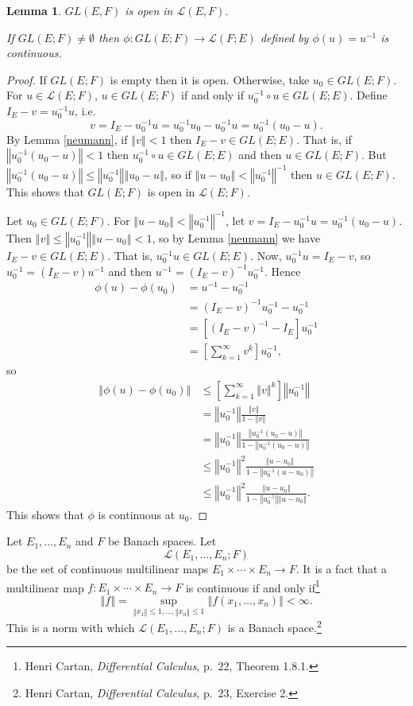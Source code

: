 \documentclass{article}
\newcommand{\norm}[1]{\left\Vert #1 \right\Vert}
\newtheorem{lemma}[theorem]{Lemma}
\theoremstyle{definition}
\begin{document}
\begin{lemma}
$GL(E,F)$ is  open  in $\mathscr{L}(E,F)$.

If $GL(E;F) \neq \emptyset$ then
$\phi:GL(E;F) \to \mathscr{L}(F;E)$ defined by $\phi(u) = u^{-1}$ is continuous. 
\end{lemma}
\begin{proof}
If $GL(E;F)$ is empty then it is open. Otherwise, take $u_0 \in GL(E;F)$. 
For $u \in \mathscr{L}(E;F)$, $u \in GL(E;F)$ if and only if $u_0^{-1} \circ u \in GL(E;E)$. 
Define $I_E-v=u_0^{-1}u$, i.e.
\[
v=I_E-u_0^{-1}  u = u_0^{-1}  u_0 - u_0^{-1}  u = u_0^{-1} (u_0-u).
\]
By Lemma \ref{neumann}, if $\norm{v}<1$ then $I_E-v \in GL(E;E)$. That is,
if $\norm{u_0^{-1}(u_0-u)}<1$ then $u_0^{-1} \circ u \in GL(E;E)$ and then
$u \in GL(E;F)$. 
But $\norm{u_0^{-1}(u_0-u)} \leq \norm{u_0^{-1}} \norm{u_0-u}$, so if 
$\norm{u-u_0}<\norm{u_0^{-1}}^{-1}$ then $u \in GL(E;F)$. 
This shows that $GL(E;F)$ is open in $\mathscr{L}(E;F)$. 

Let $u_0 \in GL(E;F)$. For $\norm{u-u_0} < \norm{u_0^{-1}}^{-1}$,
let $v=I_E-u_0^{-1}  u =  u_0^{-1}  (u_0-u)$. Then $\norm{v} \leq \norm{u_0^{-1}} \norm{u-u_0}
<1$, so by Lemma \ref{neumann} we have
$I_E-v \in GL(E;E)$. That is,
$u_0^{-1} u \in GL(E;E)$. 
Now, $u_0^{-1}u=I_E-v$, so $u_0^{-1} = (I_E-v)u^{-1}$ and then
$u^{-1}=(I_E-v)^{-1}u_0^{-1}$. Hence
\begin{align*}
\phi(u)-\phi(u_0) &= u^{-1} - u_0^{-1}\\
&= (I_E-v)^{-1}u_0^{-1} - u_0^{-1}\\
&=[(I_E-v)^{-1} - I_E] u_0^{-1}\\
&=\left[ \sum_{k=1}^\infty v^k \right] u_0^{-1},
\end{align*}
so
\begin{align*}
\norm{\phi(u)-\phi(u_0)} &\leq \left[\sum_{k=1}^\infty \norm{v}^k \right] \norm{u_0^{-1}}\\
&=\norm{u_0^{-1}} \frac{\norm{v}}{1-\norm{v}}\\
&=\norm{u_0^{-1}} \frac{\norm{u_0^{-1}  (u_0-u)}}{1-\norm{u_0^{-1}  (u_0-u)}}\\
&\leq \norm{u_0^{-1}}^2 \frac{\norm{u-u_0}}{1-\norm{u_0^{-1}(u-u_0)}}\\
&\leq \norm{u_0^{-1}}^2 \frac{\norm{u-u_0}}{1-\norm{u_0^{-1}} \norm{u-u_0}}.
\end{align*}
This shows that $\phi$ is continuous at $u_0$. 
\end{proof}

Let $E_1,\ldots,E_n$ and $F$ be Banach spaces. Let 
\[
\mathscr{L}(E_1,\ldots,E_n;F)
\]
be the set of continuous multilinear maps $E_1 \times \cdots \times E_n \to F$. 
It is a fact that a multilinear map $f:E_1 \times \cdots \times E_n \to F$ is continuous if and only
if\footnote{Henri Cartan, {\em Differential Calculus}, p.~22, Theorem 1.8.1.} 
\[
\norm{f} = \sup_{\norm{x_1} \leq 1,\ldots,\norm{x_n} \leq 1} \norm{f(x_1,\ldots,x_n)} < \infty.
\]
This is a norm with which $\mathscr{L}(E_1,\ldots,E_n;F)$ is a Banach space.\footnote{Henri Cartan, {\em Differential Calculus}, p.~23, Exercise 2.}
\end{document}
